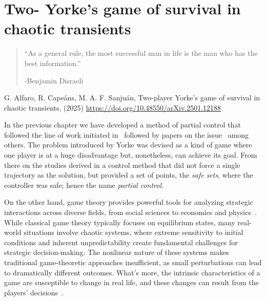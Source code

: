 \chapter{Two- Yorke's game of survival in chaotic transients} %
\label{chap:PartialControlGame}


\begin{quotation}

	\vspace{-3cm}
	\begin{flushright}
    \begin{minipage}[t][5cm][b]{0.5\textwidth}
    { ``As a general rule, the most successful man in life is the man who has the best information.''}
    
    \bigskip
    
    -{\small  Benjamin Disraeli}
    \end{minipage}
    \end{flushright}



    \vspace{0.5cm}

\end{quotation}


\vspace{0.5cm}

G. Alfaro, R. Capeáns, M. A. F. Sanjuán,
Two-player Yorke's game of survival in chaotic transients,
(2025)
\url{https://doi.org/10.48550/arXiv.2501.12188}


\vspace{1cm}


In the previous chapter we have developed a method of partial control that followed the line of work initiated in~\cite{Yorke} followed by papers on the issue~\cite{DynamicsPartialControl,PartialControlBeyond,PartialControlFunctions} among others. The problem introduced by Yorke was devised as a kind of game where one player is at a huge disadvantage but, nonetheless, can achieve its goal. From there on the studies derived in a control method that did not force a single trajectory as the solution, but provided a set of points, the \textit{safe sets}, where the controller was safe; hence the name \textit{partial control}.

On the other hand, game theory provides powerful tools for analyzing strategic interactions across diverse fields, from social sciences to economics and physics~\cite{Social,EconomyGames,GamesComplex}. While classical game theory typically focuses on equilibrium states, many real-world situations involve chaotic systems, where extreme sensitivity to initial conditions and inherent unpredictability create fundamental challenges for strategic decision-making. The nonlinear nature of these systems makes traditional game-theoretic approaches insufficient, as small perturbations can lead to dramatically different outcomes. What's more, the intrinsic characteristics of a game are susceptible to change in real life, and these changes can result from the players' decisions~\cite{AkiyamaKaneko1,AkiyamaKaneko2}.


